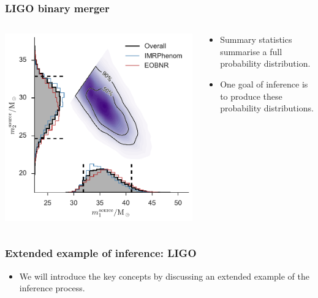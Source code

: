 \documentclass[%
]{beamer}
\begin{document}
\begin{frame}
    \frametitle{LIGO binary merger}
    \begin{columns}
        \begin{column}{0.65\textwidth}
            \includegraphics[width=\textwidth]{./figures/ligo_m1_m2.pdf}
        \end{column}
        \begin{column}{0.35\textwidth}
            \begin{itemize}
                \pause\item Summary statistics summarise a full probability distribution.
                \pause\item One goal of inference is to produce these probability distributions.
            \end{itemize}
        \end{column}
    \end{columns}
\end{frame}

\begin{frame}
    \frametitle{Extended example of inference: LIGO}
    \begin{itemize}
        \item We will introduce the key concepts by discussing an extended example of the inference process.
    \end{itemize}
\end{frame}
\end{document}
